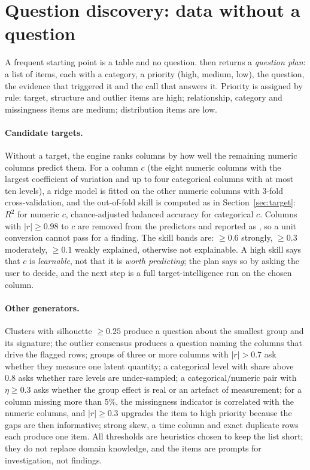 \documentclass[conference]{IEEEtran}
\begin{document}
\section{Question discovery: data without a question}\label{sec:questions}
A frequent starting point is a table and no question.  then returns a \emph{question plan}: a list of items, each with a category, a priority (high, medium, low), the question, the evidence that triggered it and the call that answers it. Priority is assigned by rule: target, structure and outlier items are high; relationship, category and missingness items are medium; distribution items are low.

\paragraph{Candidate targets.} Without a target, the engine ranks columns by how well the remaining numeric columns predict them. For a column $c$ (the eight numeric columns with the largest coefficient of variation and up to four categorical columns with at most ten levels), a ridge model is fitted on the other numeric columns with 3-fold cross-validation, and the out-of-fold skill is computed as in Section~\ref{sec:target}: $R^2$ for numeric $c$, chance-adjusted balanced accuracy for categorical $c$. Columns with $|r|\ge0.98$ to $c$ are removed from the predictors and reported as , so a unit conversion cannot pass for a finding. The skill bands are: $\ge0.6$ strongly, $\ge0.3$ moderately, $\ge0.1$ weakly explained, otherwise not explainable. A high skill says that $c$ is \emph{learnable}, not that it is \emph{worth predicting}; the plan says so by asking the user to decide, and the next step is a full target-intelligence run on the chosen column.

\paragraph{Other generators.} Clusters with silhouette $\ge0.25$ produce a question about the smallest group and its signature; the outlier consensus produces a question naming the columns that drive the flagged rows; groups of three or more columns with $|r|>0.7$ ask whether they measure one latent quantity; a categorical level with share above $0.8$ asks whether rare levels are under-sampled; a categorical/numeric pair with $\eta\ge0.3$ asks whether the group effect is real or an artefact of measurement; for a column missing more than $5\%$, the missingness indicator is correlated with the numeric columns, and $|r|\ge0.3$ upgrades the item to high priority because the gaps are then informative; strong skew, a time column and exact duplicate rows each produce one item. All thresholds are heuristics chosen to keep the list short; they do not replace domain knowledge, and the items are prompts for investigation, not findings.
\end{document}
